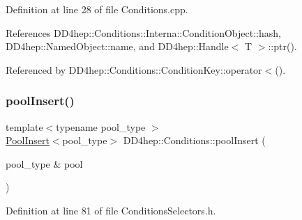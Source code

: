 Definition at line 28 of file Conditions.\+cpp.



References D\+D4hep\+::\+Conditions\+::\+Interna\+::\+Condition\+Object\+::hash, D\+D4hep\+::\+Named\+Object\+::name, and D\+D4hep\+::\+Handle$<$ T $>$\+::ptr().



Referenced by D\+D4hep\+::\+Conditions\+::\+Condition\+Key\+::operator$<$().

\hypertarget{namespace_d_d4hep_1_1_conditions_a9e28e73c1c0d3e7b66a6e47a4e49c216}{}\label{namespace_d_d4hep_1_1_conditions_a9e28e73c1c0d3e7b66a6e47a4e49c216} 
\subsubsection{\texorpdfstring{pool\+Insert()}{poolInsert()}}
{\footnotesize\ttfamily template$<$typename pool\+\_\+type $>$ \\
\hyperlink{class_d_d4hep_1_1_conditions_1_1_pool_insert}{Pool\+Insert}$<$pool\+\_\+type$>$ D\+D4hep\+::\+Conditions\+::pool\+Insert (\begin{DoxyParamCaption}\item[{pool\+\_\+type \&}]{pool }\end{DoxyParamCaption})}



Definition at line 81 of file Conditions\+Selectors.\+h.

